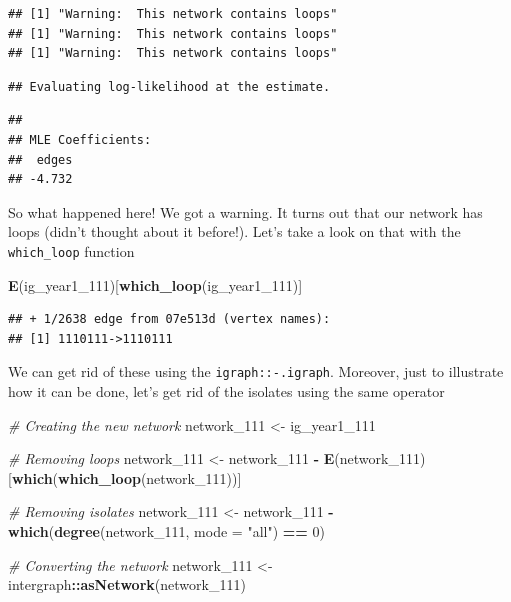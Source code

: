 \documentclass[]{book}
\newenvironment{Shaded}{\begin{snugshade}}{\end{snugshade}}
\newcommand{\KeywordTok}[1]{\textcolor[rgb]{0.13,0.29,0.53}{\textbf{#1}}}
\newcommand{\DataTypeTok}[1]{\textcolor[rgb]{0.13,0.29,0.53}{#1}}
\newcommand{\DecValTok}[1]{\textcolor[rgb]{0.00,0.00,0.81}{#1}}
\newcommand{\StringTok}[1]{\textcolor[rgb]{0.31,0.60,0.02}{#1}}
\newcommand{\CommentTok}[1]{\textcolor[rgb]{0.56,0.35,0.01}{\textit{#1}}}
\newcommand{\OperatorTok}[1]{\textcolor[rgb]{0.81,0.36,0.00}{\textbf{#1}}}
\newcommand{\NormalTok}[1]{#1}
\theoremstyle{definition}
\theoremstyle{definition}
\theoremstyle{definition}
\theoremstyle{remark}
\begin{document}
\begin{verbatim}
## [1] "Warning:  This network contains loops"
## [1] "Warning:  This network contains loops"
## [1] "Warning:  This network contains loops"
\end{verbatim}

\begin{verbatim}
## Evaluating log-likelihood at the estimate.
\end{verbatim}

\begin{verbatim}
## 
## MLE Coefficients:
##  edges  
## -4.732
\end{verbatim}

So what happened here! We got a warning. It turns out that our network
has loops (didn't thought about it before!). Let's take a look on that
with the \texttt{which\_loop} function

\begin{Shaded}
\begin{Highlighting}[]
\KeywordTok{E}\NormalTok{(ig_year1_}\DecValTok{111}\NormalTok{)[}\KeywordTok{which_loop}\NormalTok{(ig_year1_}\DecValTok{111}\NormalTok{)]}
\end{Highlighting}
\end{Shaded}

\begin{verbatim}
## + 1/2638 edge from 07e513d (vertex names):
## [1] 1110111->1110111
\end{verbatim}

We can get rid of these using the \texttt{igraph::-.igraph}. Moreover,
just to illustrate how it can be done, let's get rid of the isolates
using the same operator

\begin{Shaded}
\begin{Highlighting}[]
\CommentTok{# Creating the new network}
\NormalTok{network_}\DecValTok{111}\NormalTok{ <-}\StringTok{ }\NormalTok{ig_year1_}\DecValTok{111}

\CommentTok{# Removing loops}
\NormalTok{network_}\DecValTok{111}\NormalTok{ <-}\StringTok{ }\NormalTok{network_}\DecValTok{111} \OperatorTok{-}\StringTok{ }\KeywordTok{E}\NormalTok{(network_}\DecValTok{111}\NormalTok{)[}\KeywordTok{which}\NormalTok{(}\KeywordTok{which_loop}\NormalTok{(network_}\DecValTok{111}\NormalTok{))]}

\CommentTok{# Removing isolates}
\NormalTok{network_}\DecValTok{111}\NormalTok{ <-}\StringTok{ }\NormalTok{network_}\DecValTok{111} \OperatorTok{-}\StringTok{ }\KeywordTok{which}\NormalTok{(}\KeywordTok{degree}\NormalTok{(network_}\DecValTok{111}\NormalTok{, }\DataTypeTok{mode =} \StringTok{"all"}\NormalTok{) }\OperatorTok{==}\StringTok{ }\DecValTok{0}\NormalTok{)}

\CommentTok{# Converting the network}
\NormalTok{network_}\DecValTok{111}\NormalTok{ <-}\StringTok{ }\NormalTok{intergraph}\OperatorTok{::}\KeywordTok{asNetwork}\NormalTok{(network_}\DecValTok{111}\NormalTok{)}
\end{Highlighting}
\end{Shaded}
\end{document}
